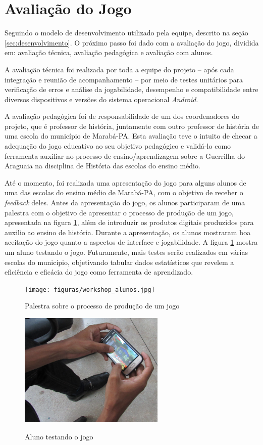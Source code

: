 \section{Avaliação do Jogo}
\label{sec:avaliacao}

Seguindo o modelo de desenvolvimento utilizado pela equipe, descrito na seção \ref{sec:desenvolvimento}. O próximo passo foi dado com a avaliação do jogo, dividida em: avaliação técnica, avaliação pedagógica e avaliação com alunos.

A avaliação técnica foi realizada por toda a equipe do projeto -- após cada integração e reunião de acompanhamento -- por meio de testes unitários para verificação de erros e análise da jogabilidade, desempenho e compatibilidade entre diversos dispositivos e versões do sistema operacional \textit{Android}.

A avaliação pedagógica foi de responsabilidade de um dos coordenadores do projeto, que é professor de história, juntamente com outro professor de história de uma escola do município de Marabá-PA. Esta avaliação teve o intuito de checar a adequação do jogo educativo ao seu objetivo pedagógico e validá-lo como ferramenta auxiliar no processo de ensino/aprendizagem sobre a Guerrilha do Araguaia na disciplina de História das escolas do ensino médio.

Até o momento, foi realizada uma apresentação do jogo para alguns alunos de uma das escolas do ensino médio de Marabá-PA, com o objetivo de receber o \textit{feedback} deles. Antes da apresentação do jogo, os alunos participaram de uma palestra com o objetivo de apresentar o processo de produção de um jogo, apresentada na figura \ref{fig:palestra-jogos}, além de introduzir os produtos digitais produzidos para auxilio ao ensino de história. Durante a apresentação, os alunos mostraram boa aceitação do jogo quanto a aspectos de interface e jogabilidade. A figura \ref{fig:palestra-jogos} mostra um aluno testando o jogo. Futuramente, mais testes serão realizados em várias escolas do município, objetivando tabular dados estatísticos que revelem a eficiência e eficácia do jogo como ferramenta de aprendizado.

\begin{figure}[H]
	\centering
	\caption{Palestra sobre o processo de produção de um jogo}
	\texttt{[image: figuras/workshop\_alunos.jpg]}
	\label{fig:palestra-jogos}
	{}
\end{figure}

\begin{figure}[H]
	\centering
	\caption{Aluno testando o jogo}
	\includegraphics[width=0.62\textwidth]{figuras/aluno_teste.jpg}
	\label{fig:avaliacao-aluno}
	{}
\end{figure}